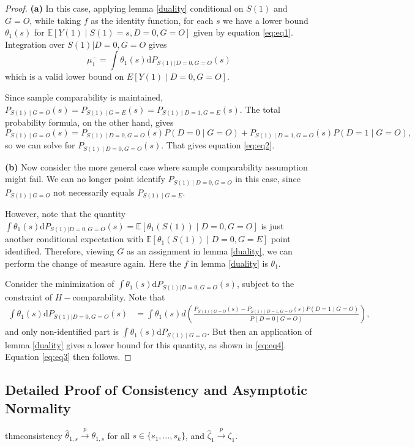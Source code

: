 \documentclass[12pt]{article}
\newcommand{\Ep}{\mathbb{E}}
\begin{document}
	\lb*
	\begin{proof}

		\textbf{(a)} In this case, applying lemma \ref{duality} conditional on $S(1)$ and $G = O$, while taking $f$ as the identity function, for each $s$ we have a lower bound $\theta_1(s)$ for $\Ep[Y(1) \mid S(1) = s, D = 0, G = O]$ given by equation \ref{eq:eq1}. Integration over $S(1) | D = 0, G = O$ gives
		$$\mu^-_1 = \int \theta_1(s) \mathrm{d} P_{S(1) | D = 0, G = O}(s)$$
		which is a valid lower bound on $E[Y(1) \mid D = 0, G = O]$. 
		
		Since sample comparability is maintained, $P_{S(1) \mid G = O}(s) = P_{S(1) \mid G = E}(s) = P_{S(1) \mid D = 1, G = E}(s)$. The total probability formula, on the other hand, gives $$
		P_{S(1) \mid G = O}(s) = P_{S(1) \mid D= 0, G = O}(s) P(D = 0 \mid G = O) +  P_{S(1) \mid D=1, G = O}(s) P(D = 1 \mid G = O),
		$$
		so we can solve for $P_{S(1) \mid D = 0, G = O}(s)$. That gives equation \ref{eq:eq2}.
		
		\textbf{(b)}
		Now consider the more general case where sample comparability assumption might fail. We can no longer point identify $P_{S(1) \mid D = 0, G = O}$ in this case, since $P_{S(1) \mid G = O}$ not necessarily equals $P_{S(1) \mid G = E}$. 
		
		However, note that the quantity $\int \theta_1(s) \mathrm{d} P_{S(1) | D = 0, G = O}(s) = \Ep[\theta_1(S(1)) \mid D = 0, G = O]$ is just another conditional expectation with $\Ep[\theta_1(S(1)) \mid D = 0, G = E]$ point identified. Therefore, viewing $G$ as an assignment in lemma \ref{duality}, we can perform the change of measure again. Here the $f$ in lemma \ref{duality} is $\theta_1$.
		
		Consider the minimization of $\int \theta_1(s) \mathrm{d} P_{S(1) | D = 0, G = O}(s)$, subject to the constraint of $H-$comparability. Note that 
		\begin{align*}
		     \int \theta_1(s) \mathrm{d} P_{S(1) | D = 0, G = O}(s)
		     & = \int \theta_1(s) d \left( \frac{P_{S(1) \mid G = O}(s) - P_{S(1) \mid D = 1, G = O}(s) P(D = 1 \mid G = O)}{P(D = 0 \mid G = O)} \right),
		\end{align*}
		and only non-identified part is $\int \theta_1(s) \mathrm{d} P_{S(1) \mid G = O}$. But then an application of lemma \ref{duality} gives a lower bound for this quantity, as shown in \ref{eq:eq4}. Equation \ref{eq:eq3} then follows.
	\end{proof}
	

    \subsection{Detailed Proof of Consistency and Asymptotic Normality}
	\begin{restatable}{thm}{consistency}
		\label{consistency}
		$\hat{\theta}_{1,s} \overset{p}{\to} \theta_{1,s}$ for all $s \in \{s_1, \ldots, s_k\}$, and $\hat{\zeta}_1 \overset{p}{\to} \zeta_1$. 
	\end{restatable}
	
\end{document}
